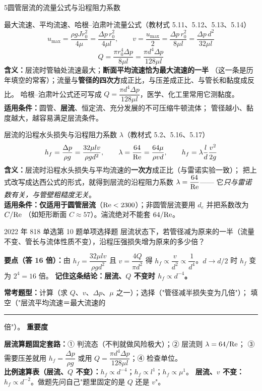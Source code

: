 \begin{kaodian}{5}{圆管层流的流量公式与沿程阻力系数}
\begin{gongshi}{最大流速、平均流速、哈根--泊肃叶流量公式（教材式 5.11、5.12、5.13、5.14）}
\[ u_{\max}=\frac{\rho g J r_0^2}{4\mu}=\frac{\Delta p\,r_0^2}{4\mu l},\qquad
   v=\frac{u_{\max}}{2}=\frac{\Delta p\,r_0^2}{8\mu l}=\frac{\Delta p\,d^2}{32\mu l} \]
\[ Q=\frac{\pi r_0^4\Delta p}{8\mu l}=\frac{\pi d^4\Delta p}{128\mu l} \]
\textbf{含义：}层流时管轴处流速最大；\textbf{断面平均流速恰为最大流速的一半}
（这一条是历年填空的常客）；流量与\textbf{管径的四次方}成正比，与压差成正比、与管长和黏度成反比。
哈根--泊肃叶公式还可写成 $Q=\dfrac{\pi d^4\Delta p}{128\mu l}$，医学、化工里常用它测黏度。\\
\textbf{适用条件：}圆管、\textbf{层流}、恒定流、充分发展的不可压缩牛顿流体；
管径越小、黏度越大，越容易满足层流条件。
\end{gongshi}

\begin{gongshi}{层流的沿程水头损失与沿程阻力系数 $\lambda$（教材式 5.2、5.16、5.17）}
\[ h_f=\frac{\Delta p}{\rho g}=\frac{32\mu l v}{\rho g d^2},\qquad
   \lambda=\frac{64}{\mathrm{Re}}=\frac{64\mu}{\rho v d},\qquad
   h_f=\lambda\frac{l}{d}\frac{v^2}{2g} \]
\textbf{含义：}层流时沿程水头损失与平均流速的\textbf{一次方}成正比（与雷诺实验一致）；
把上式改写成达西公式的形式，就得到层流的沿程阻力系数 $\lambda=\dfrac{64}{\mathrm{Re}}$——
它\emph{只与雷诺数有关，与管壁粗糙度无关}。\\
\textbf{适用条件：}\textbf{仅适用于圆管层流}（$\mathrm{Re}<2300$）；非圆管层流要用 $d_e$ 并把系数改为 $C/\mathrm{Re}$
（如矩形断面 $C\approx 57$）。湍流绝对不能套 $64/\mathrm{Re}$。
\end{gongshi}

\begin{zhenti}{2022 年 818 单选第 10 题}{单项选择题}
层流状态下，若管径减为原来的一半（流量不变、管长与流体性质不变），沿程压强损失增为原来的多少倍？
\end{zhenti}
\noindent\textbf{要点（答 16 倍）：}由 $h_f=\dfrac{32\mu lv}{\rho g d^2}$ 且 $v=\dfrac{4Q}{\pi d^2}$ 得
$h_f\propto\dfrac{v}{d^2}\propto\dfrac{1}{d^4}$。$d\to d/2$ 时 $h_f$ 变为 $2^4=16$ 倍。
\textbf{记住这条结论：层流、$Q$ 不变时 $h_f\propto d^{-4}$。}

\textbf{常考题型：}计算（求 $Q$、$v$、$\Delta p$、$\mu$ 之一）；选择（"管径减半损失变为几倍"）；
填空（"层流平均流速＝最大流速的\rule{1.2cm}{0.4pt}倍"）。
\textbf{重要度 }\quad{}\quad{}

\begin{banfa}
\textbf{层流算题固定套路：}① 判流态（不判就做风险极大）；② 层流则 $\lambda=64/\mathrm{Re}$；
③ 需要压差就用 $h_f=\dfrac{\Delta p}{\rho g}$ 或用 $Q=\dfrac{\pi d^4\Delta p}{128\mu l}$；④ 检查单位。\\
\textbf{比例速算表（层流、$Q$ 不变）：}$h_f\propto d^{-4}$；$h_f\propto l^{1}$；$h_f\propto\mu^{1}$。
\textbf{层流、$v$ 不变：}$h_f\propto d^{-2}$。做题先问自己"题里固定的是 $Q$ 还是 $v$"。
\end{banfa}
\end{kaodian}


